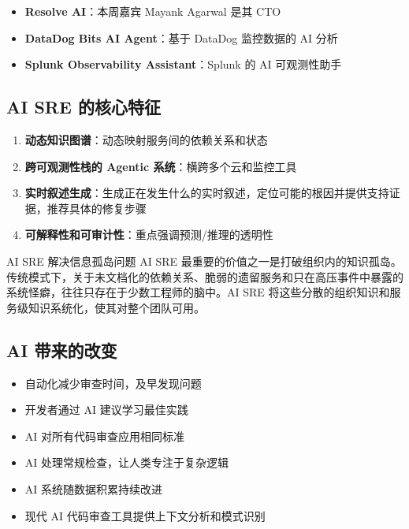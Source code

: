 \documentclass[a4paper]{article}
\begin{document}
\begin{itemize}
    \item \textbf{Resolve AI}：本周嘉宾 Mayank Agarwal 是其 CTO
    \item \textbf{DataDog Bits AI Agent}：基于 DataDog 监控数据的 AI 分析
    \item \textbf{Splunk Observability Assistant}：Splunk 的 AI 可观测性助手
\end{itemize}

\subsection{AI SRE 的核心特征}

\begin{enumerate}
    \item \textbf{动态知识图谱}：动态映射服务间的依赖关系和状态
    \item \textbf{跨可观测性栈的 Agentic 系统}：横跨多个云和监控工具
    \item \textbf{实时叙述生成}：生成正在发生什么的实时叙述，定位可能的根因并提供支持证据，推荐具体的修复步骤
    \item \textbf{可解释性和可审计性}：重点强调预测/推理的透明性
\end{enumerate}

\begin{knowledgebox}{AI SRE 解决信息孤岛问题}
AI SRE 最重要的价值之一是打破组织内的知识孤岛。传统模式下，关于未文档化的依赖关系、脆弱的遗留服务和只在高压事件中暴露的系统怪癖，往往只存在于少数工程师的脑中。AI SRE 将这些分散的组织知识和服务级知识系统化，使其对整个团队可用。
\end{knowledgebox}

\subsection{AI 带来的改变}

\begin{itemize}
    \item 自动化减少审查时间，及早发现问题
    \item 开发者通过 AI 建议学习最佳实践
    \item AI 对所有代码审查应用相同标准
    \item AI 处理常规检查，让人类专注于复杂逻辑
    \item AI 系统随数据积累持续改进
    \item 现代 AI 代码审查工具提供上下文分析和模式识别
\end{itemize}
\end{document}
